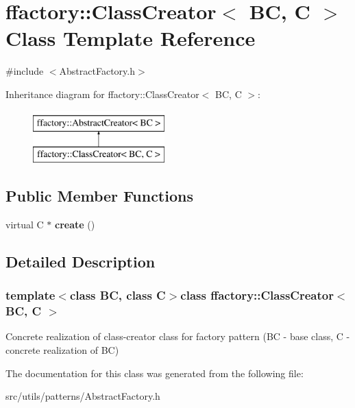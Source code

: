\hypertarget{classffactory_1_1_class_creator}{\section{ffactory\-:\-:Class\-Creator$<$ B\-C, C $>$ Class Template Reference}
\label{classffactory_1_1_class_creator}
}


{\ttfamily \#include $<$Abstract\-Factory.\-h$>$}

Inheritance diagram for ffactory\-:\-:Class\-Creator$<$ B\-C, C $>$\-:\begin{figure}[H]
\begin{center}
\leavevmode
\includegraphics[height=2.000000cm]{classffactory_1_1_class_creator}
\end{center}
\end{figure}
\subsection*{Public Member Functions}
\begin{DoxyCompactItemize}
\item 
\hypertarget{classffactory_1_1_class_creator_a7a8eba0cd42aedc59b7e608085bbf6d7}{virtual C $\ast$ {\bfseries create} ()}\label{classffactory_1_1_class_creator_a7a8eba0cd42aedc59b7e608085bbf6d7}

\end{DoxyCompactItemize}


\subsection{Detailed Description}
\subsubsection*{template$<$class B\-C, class C$>$class ffactory\-::\-Class\-Creator$<$ B\-C, C $>$}

Concrete realization of class-\/creator class for factory pattern (B\-C -\/ base class, C -\/ concrete realization of B\-C) 

The documentation for this class was generated from the following file\-:\begin{DoxyCompactItemize}
\item 
src/utils/patterns/Abstract\-Factory.\-h\end{DoxyCompactItemize}
